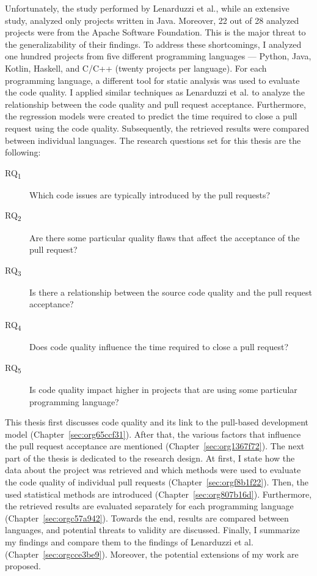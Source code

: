 \documentclass[digital,oneside,oldtable,nolof,nolot,nocover]{fithesis4}
\begin{document}
Unfortunately, the study performed by Lenarduzzi et al., while an extensive
study, analyzed only projects written in Java. Moreover, 22 out of 28 analyzed
projects were from the Apache Software Foundation. This is the major threat to
the generalizability of their findings. To address these shortcomings, I
analyzed one hundred projects from five different programming languages ---
Python, Java, Kotlin, Haskell, and C/C++ (twenty projects per language). For
each programming language, a different tool for static analysis was used to
evaluate the code quality. I applied similar techniques as Lenarduzzi et
al. to analyze the relationship between the code quality and pull request
acceptance. Furthermore, the regression models were created to predict the
time required to close a pull request using the code quality. Subsequently,
the retrieved results were compared between individual languages.
The research questions set for this thesis are the following:
\begin{description}
\item[{RQ\textsubscript{1}}] Which code issues are typically introduced by the pull requests?
\item[{RQ\textsubscript{2}}] Are there some particular quality flaws that affect the acceptance of the pull request?
\item[{RQ\textsubscript{3}}] Is there a relationship between the source code quality and the pull request acceptance?
\item[{RQ\textsubscript{4}}] Does code quality influence the time required to close a pull request?
\item[{RQ\textsubscript{5}}] Is code quality impact higher in projects that are using some particular programming language?
\end{description}

This thesis first discusses code quality and its link to the pull-based
development model (Chapter~\ref{sec:org65ccf31}).
After that, the various factors that influence the pull request acceptance are
mentioned (Chapter~\ref{sec:org1367f72}). The next part of the thesis
is dedicated to the research design. At first, I state how the data about the
project was retrieved and which methods were used to evaluate the code quality
of individual pull requests (Chapter~\ref{sec:orgf8b1f22}). Then, the used
statistical methods are introduced (Chapter~\ref{sec:org807b16d}). Furthermore,
the retrieved results are evaluated separately for each programming language
(Chapter~\ref{sec:orgc57a942}). Towards the end, results are compared between
languages, and potential threats to validity are discussed. Finally, I
summarize my findings and compare them to the findings of Lenarduzzi et al.
(Chapter~\ref{sec:orgcce3be9}). Moreover, the potential extensions of my work are
proposed.
\end{document}
